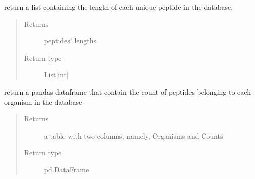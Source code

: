 \documentclass[letterpaper,10pt,english]{sphinxmanual}
\begin{document}
\begin{fulllineitems}
\begin{fulllineitems}
\end{fulllineitems}


\begin{fulllineitems}
\label{\detokenize{IPTK.Classes:IPTK.Classes.Experiment.Experiment.get_peptides_length}}
return a list containing the length of each unique peptide in the database.
\begin{quote}\begin{description}
\item[{Returns}] \leavevmode
peptides’ lengths

\item[{Return type}] \leavevmode
List{[}int{]}

\end{description}\end{quote}

\end{fulllineitems}


\begin{fulllineitems}
\label{\detokenize{IPTK.Classes:IPTK.Classes.Experiment.Experiment.get_peptides_per_organism}}
return a pandas dataframe that contain the count of peptides belonging to each organism in
the database
\begin{quote}\begin{description}
\item[{Returns}] \leavevmode
a table with two columns, namely, Organisms and Counts

\item[{Return type}] \leavevmode
pd.DataFrame

\end{description}\end{quote}

\end{fulllineitems}



\end{fulllineitems}
\end{document}
